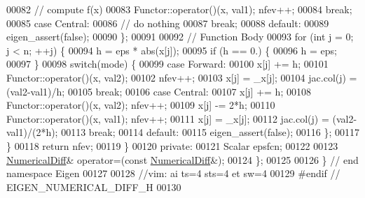 \begin{DoxyCode}
00082                 \textcolor{comment}{// compute f(x)}
00083                 Functor::operator()(x, val1); nfev++;
00084                 \textcolor{keywordflow}{break};
00085             \textcolor{keywordflow}{case} Central:
00086                 \textcolor{comment}{// do nothing}
00087                 \textcolor{keywordflow}{break};
00088             \textcolor{keywordflow}{default}:
00089                 eigen\_assert(\textcolor{keyword}{false});
00090         \};
00091 
00092         \textcolor{comment}{// Function Body}
00093         \textcolor{keywordflow}{for} (\textcolor{keywordtype}{int} j = 0; j < n; ++j) \{
00094             h = eps * abs(x[j]);
00095             \textcolor{keywordflow}{if} (h == 0.) \{
00096                 h = eps;
00097             \}
00098             \textcolor{keywordflow}{switch}(mode) \{
00099                 \textcolor{keywordflow}{case} Forward:
00100                     x[j] += h;
00101                     Functor::operator()(x, val2);
00102                     nfev++;
00103                     x[j] = \_x[j];
00104                     jac.col(j) = (val2-val1)/h;
00105                     \textcolor{keywordflow}{break};
00106                 \textcolor{keywordflow}{case} Central:
00107                     x[j] += h;
00108                     Functor::operator()(x, val2); nfev++;
00109                     x[j] -= 2*h;
00110                     Functor::operator()(x, val1); nfev++;
00111                     x[j] = \_x[j];
00112                     jac.col(j) = (val2-val1)/(2*h);
00113                     \textcolor{keywordflow}{break};
00114                 \textcolor{keywordflow}{default}:
00115                     eigen\_assert(\textcolor{keyword}{false});
00116             \};
00117         \}
00118         \textcolor{keywordflow}{return} nfev;
00119     \}
00120 \textcolor{keyword}{private}:
00121     Scalar epsfcn;
00122 
00123     \hyperlink{class_eigen_1_1_numerical_diff}{NumericalDiff}& operator=(\textcolor{keyword}{const} \hyperlink{class_eigen_1_1_numerical_diff}{NumericalDiff}&);
00124 \};
00125 
00126 \} \textcolor{comment}{// end namespace Eigen}
00127 
00128 \textcolor{comment}{//vim: ai ts=4 sts=4 et sw=4}
00129 \textcolor{preprocessor}{#endif // EIGEN\_NUMERICAL\_DIFF\_H}
00130 
\end{DoxyCode}
